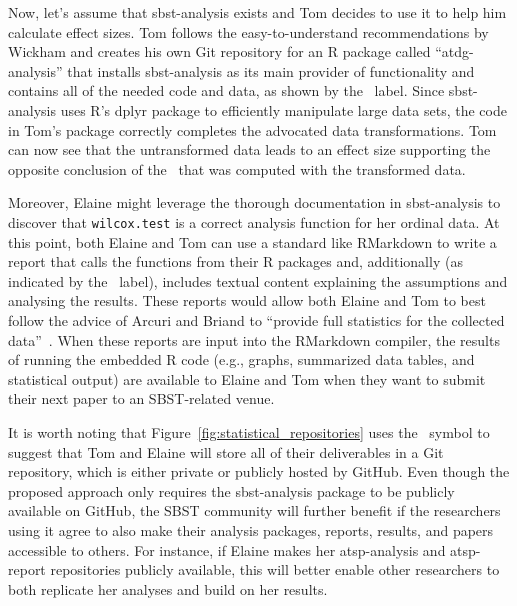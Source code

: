 Now, let's assume that sbst-analysis exists and Tom decides to use it to help him calculate effect sizes. Tom follows
the easy-to-understand recommendations by Wickham and creates his own Git repository for an R package called
``atdg-analysis'' that installs sbst-analysis as its main provider of functionality and contains all of the needed code
and data, as shown by the \codedatagit~label. Since sbst-analysis uses R's dplyr package to efficiently manipulate large
data sets, the code in Tom's package correctly completes the advocated data transformations.  Tom can now see that the
untransformed data leads to an effect size supporting the opposite conclusion of the \atwelve~that was computed with
the transformed data.


Moreover, Elaine might leverage the thorough documentation in sbst-analysis to discover that {\tt wilcox.test} is a
correct analysis function for her ordinal data. At this point, both Elaine and Tom can use a standard like RMarkdown to
write a report that calls the functions from their R packages and, additionally (as indicated by the
\codeeditgit~label), includes textual content explaining the assumptions and analysing the results. These reports would
allow both Elaine and Tom to best follow the advice of Arcuri and Briand to ``provide full statistics for the collected
data''~\cite{Arcuri2014}. When these reports are input into the RMarkdown compiler, the results of running the
embedded R code (e.g., graphs, summarized data tables, and statistical output) are available to Elaine and Tom when they
want to submit their next paper to an SBST-related venue.

It is worth noting that Figure~\ref{fig:statistical_repositories} uses the \faGit~symbol to suggest that Tom and Elaine
will store all of their deliverables in a Git repository, which is either private or publicly hosted by GitHub. Even though
the proposed approach only requires the sbst-analysis package to be publicly available on GitHub, the SBST community will further
benefit if the researchers using it agree to also make their analysis packages, reports, results, and papers accessible
to others. For instance, if Elaine makes her atsp-analysis and atsp-report repositories publicly available, this will
better enable other researchers to both replicate her analyses and build on her results.
